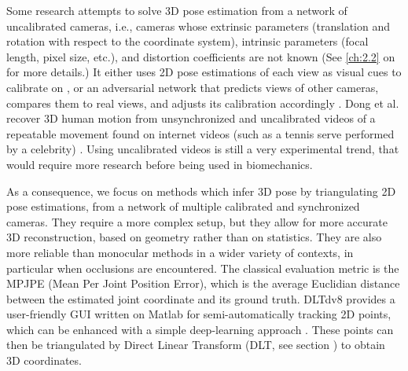 Some research attempts to solve 3D pose estimation from a network of uncalibrated cameras, i.e., cameras whose extrinsic parameters (translation and rotation with respect to the coordinate system), intrinsic parameters (focal length, pixel size, etc.), and distortion coefficients are not known (See \autoref{ch:2.2} on  for more details.) It either uses 2D pose estimations of each view as visual cues to calibrate on \cite{Takahashi2018, Xu2021, Liu2022a}, or an adversarial network that predicts views of other cameras, compares them to real views, and adjusts its calibration accordingly \cite{Ershadi-Nasab2021}. Dong et al. recover 3D human motion from unsynchronized and uncalibrated videos of a repeatable movement found on internet videos (such as a tennis serve performed by a celebrity) \cite{Dong2020}. Using uncalibrated videos is still a very experimental trend, that would require more research before being used in biomechanics. 

As a consequence, we focus on methods which infer 3D pose by triangulating 2D pose estimations, from a network of multiple calibrated and synchronized cameras. They require a more complex setup, but they allow for more accurate 3D reconstruction, based on geometry rather than on statistics. They are also more reliable than monocular methods in a wider variety of contexts, in particular when occlusions are encountered. The classical evaluation metric is the MPJPE (Mean Per Joint Position Error), which is the average Euclidian distance between the estimated joint coordinate and its ground truth. DLTdv8 provides a user-friendly GUI written on Matlab for semi-automatically tracking 2D points, which can be enhanced with a simple deep-learning approach \cite{Hedrick2008,DLTdv8}. These points can then be triangulated by Direct Linear Transform (DLT, see section ) to obtain 3D coordinates. 

